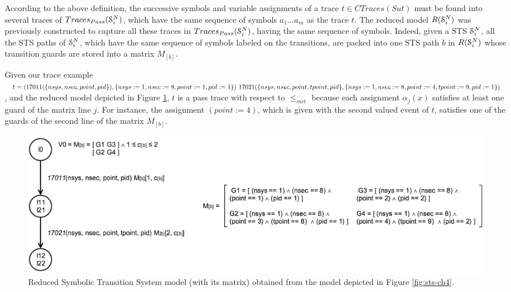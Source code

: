 According to the above definition, the successive symbols and
variable assignments of a trace $t \in CTraces({Sut})$ must be
found into several traces of $Traces_{Pass}(\EuScript{S}_i^{N})$,
which have the same sequence of symbols $a_1 \dots a_m$ as the
trace $t$. The reduced model $R(\EuScript{S}_i^{N})$ was
previously constructed to capture all these traces in
$Traces_{Pass}(\EuScript{S}_i^{N})$, having the same sequence of
symbols. Indeed, given a STS $\EuScript{S}_i^{N}$, all the STS
paths of $\EuScript{S}_i^{N}$, which have the same sequence of
symbols labeled on the transitions, are packed into one STS path
$b$ in $R(\EuScript{S}_i^{N})$ whose transition guards are stored
into a matrix $M_{[b]}$.

\begin{example}
    Given our trace example $t = (17011(\{ nsys, nsec, point, pid
    \}), \{ nsys\\:=1, nsec:=8, point:=1, pid:=1 \})\text{ }
    17021(\{ nsys, nsec, point, tpoint, pid \}, \{ nsys\\:=1,
    nsec:=8, point:=4, tpoint:=9, pid:=1 \})$, and the reduced
    model depicted in Figure \ref{fig:sts-reduced-ch4}, $t$ is a
    pass trace with respect to $\leq_{mct}$ because each
    assignment $\alpha_j(x)$ satisfies at least one guard of the
    matrix line $j$. For instance, the assignment $(point := 4)$,
    which is given with the second valued event of $t$,
    satisfies one of the guards of the second line of the matrix
    $M_{[b]}$.

    \begin{figure}[h]
        \begin{center}
            \includegraphics[width=1.0\linewidth]{figures/reduced_sts_ch4.png}
        \end{center}

        \caption{Reduced Symbolic Transition System model (with
        its matrix) obtained from the model depicted in Figure
        \ref{fig:sts-ch4}.}
        \label{fig:sts-reduced-ch4}
    \end{figure}
\end{example}

